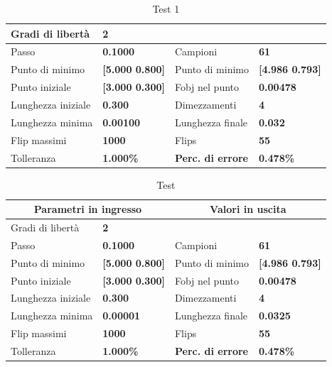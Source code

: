 \documentclass[a4paper, 11pt]{article}
\begin{document}
\begin{table}[h]
    \caption{Test 1}
    \begin{center}
    \begin{tabular}{|l|l|l|l|} 
    \hline 
Gradi di libertà & \textbf{2} &  &  \\ \hline 
Passo & \textbf{0.1000} & Campioni & \textbf{61} \\ \hline 
Punto di minimo & \textbf{{[}5.000 0.800{]}} & Punto di minimo &
\textbf{{[}4.986 0.793{]}} \\ \hline 
Punto iniziale & \textbf{{[}3.000 0.300{]}} & Fobj nel punto & \textbf{0.00478}
\\ \hline 
Lunghezza iniziale & \textbf{0.300} & Dimezzamenti & \textbf{4} \\ \hline 
Lunghezza minima & \textbf{0.00100} & Lunghezza finale & \textbf{0.032} \\
\hline
Flip massimi & \textbf{1000} & Flips & \textbf{55} \\ \hline 
Tolleranza & \textbf{1.000\%} & \textbf{Perc. di errore} & \textbf{0.478\%} \\
\hline 
    \end{tabular}
    \end{center}
    \end{table}

    \begin{table}[h]
        \caption{Test}
        \begin{center}
        \begin{tabular}{|l|l|l|l|} 
        \hline
        \multicolumn{2}{|c|}{Parametri in ingresso} & \multicolumn{2}{c|}{Valori in uscita} \\ \hline
        Gradi di libertà  & \textbf{2} &  &  \\ \hline 
        Passo & \textbf{0.1000} & Campioni & \textbf{61} \\ \hline 
        Punto di minimo & \textbf{{[}5.000 0.800{]}} & Punto di minimo & \textbf{{[}4.986 0.793{]}} \\ \hline 
        Punto iniziale & \textbf{{[}3.000 0.300{]}} & Fobj nel punto & \textbf{0.00478} \\ \hline 
        Lunghezza iniziale & \textbf{0.300} & Dimezzamenti & \textbf{4} \\ \hline 
        Lunghezza minima & \textbf{0.00001} & Lunghezza finale & \textbf{0.0325} \\ \hline
        Flip massimi & \textbf{1000} & Flips & \textbf{55} \\ \hline 
        Tolleranza & \textbf{1.000\%} & \textbf{Perc. di errore} & \textbf{0.478\%} \\ \hline 
        \end{tabular} 
        \end{center}
        \end{table}
    
\end{document}
